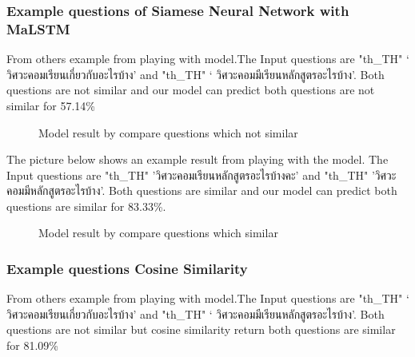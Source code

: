 \documentclass[12pt,oneside,openright,a4paper]{cpe-english-project}
\begin{document}
\subsubsection{Example questions of Siamese Neural Network with MaLSTM}
From others example from playing with model.The Input questions are
{
\XeTeXlinebreaklocale "th_TH"	
\thaifont 
 ‘ วิศวะคอมเรียนเกี่ยวกับอะไรบ้าง’ }and 
{
\XeTeXlinebreaklocale "th_TH"	
\thaifont ‘ วิศวะคอมมีเรียนหลักสูตรอะไรบ้าง’.}
 Both questions are not similar and our model can predict both questions are not similar for 57.14\%
\begin{figure}[!h]\centering
{}
\caption{Model result by compare questions which not similar}\label{fig:Model result by compare questions which not similar}
\end{figure}

The picture below shows an example result from playing with the model. The Input questions are
{
\XeTeXlinebreaklocale "th_TH"	
\thaifont 
'วิศวะคอมเรียนหลักสูตรอะไรบ้างคะ' }
and
{
\XeTeXlinebreaklocale "th_TH"	
\thaifont 
 'วิศวะคอมมีหลักสูตรอะไรบ้าง'. 
}Both questions are similar and our model can predict both questions are similar for 83.33\%.
\begin{figure}[!h]\centering
{}
\caption{Model result by compare questions which similar}\label{fig:Model result by compare questions which similar}
\end{figure}



\subsubsection{Example questions Cosine Similarity}
From others example from playing with model.The Input questions are
{
\XeTeXlinebreaklocale "th_TH"	
\thaifont 
 ‘ วิศวะคอมเรียนเกี่ยวกับอะไรบ้าง’ }and 
{
\XeTeXlinebreaklocale "th_TH"	
\thaifont ‘ วิศวะคอมมีเรียนหลักสูตรอะไรบ้าง’.}
 Both questions are not similar but cosine similarity return both questions are similar for 81.09\%
\end{document}
